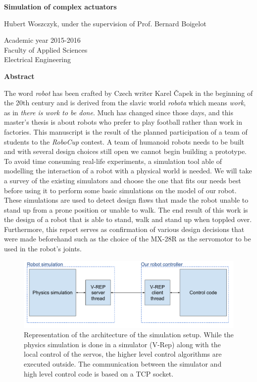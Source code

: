 \thispagestyle{empty}
\begin{center}
    \Large
    \textbf{Simulation of complex actuators}
    
    \vspace{0.4cm}
    \large
    Hubert Woszczyk, under the supervision of Prof. Bernard Boigelot
    
    \normalsize
    Academic year 2015-2016\\
    Faculty of Applied Sciences\\
    Electrical Engineering
    
    \vspace{0.9cm}
    \textbf{Abstract}
\end{center}
The word \emph{robot} has been crafted by Czech writer Karel Čapek in the beginning of the 20th century and is derived from the slavic world \emph{robota} which means \emph{work}, as in \emph{there is work to be done}. Much has changed since those days, and this master's thesis is about robots who prefer to play football rather than work in factories. This manuscript is the result of the planned participation of a team of students to the \emph{RoboCup} contest. A team of humanoid robots needs to be built and with several design choices still open we cannot begin building a prototype. To avoid time consuming real-life experiments, a simulation tool able of modelling the interaction of a robot with a physical world is needed. We will take a survey of the existing simulators and choose the one that fits our needs best before using it to perform some basic simulations on the model of our robot. These simulations are used to detect design flaws that made the robot unable to stand up from a prone position or unable to walk. The end result of this work is the design of a robot that is able to stand, walk and stand up when toppled over. Furthermore, this report serves as confirmation of various design decisions that were made beforehand such as the choice of the MX-28R as the servomotor to be used in the robot's joints.
\clearpage

\thispagestyle{empty}
\vspace*{3cm}
\begin{figure}[htp]
\center
    \includegraphics[width = \textwidth]{figures/simulation_principles}
    \caption[]{Representation of the architecture of the simulation setup. While the physics simulation is done in a simulator (V-Rep) along with the local control of the servos, the higher level control algorithms are executed outside. The communication between the simulator and high level control code is based on a TCP socket.}
    \label{fig:abstract1}
\end{figure}

